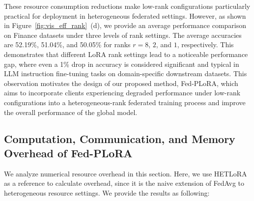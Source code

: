 \documentclass{article} %
\begin{document}
These resource consumption reductions make low-rank configurations particularly practical for deployment in heterogeneous federated settings. However, as shown in Figure~\ref{fig:vis_eff_rank}~(d), we provide an average performance comparison on Finance datasets under three levels of rank settings. The average accuracies are 52.19\%, 51.04\%, and 50.05\% for ranks $r = 8$, $2$, and $1$, respectively. This demonstrates that different LoRA rank settings lead to a noticeable performance gap, where even a 1\% drop in accuracy is considered significant and typical in LLM instruction fine-tuning tasks on domain-specific downstream datasets. This observation motivates the design of our proposed method, Fed-PLoRA, which aims to incorporate clients experiencing degraded performance under low-rank configurations into a heterogeneous-rank federated training process and improve the overall performance of the global model.


\subsection{Computation, Communication, and Memory Overhead of Fed-PLoRA}\label{appendixsec:overhead_analysis}

We analyze numerical resource overhead in this section. Here, we use HETLoRA~\cite{cho2024heterogeneous} as a reference to calculate overhead, since it is the naive extension of FedAvg to heterogeneous resource settings. We provide the results as following: 



% 
\end{document}
